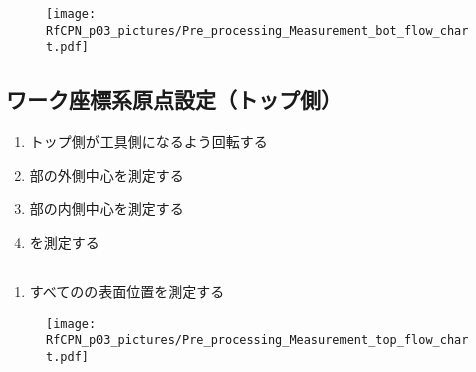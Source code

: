 \begin{figure}[ht]%
\begin{Figbox}[valign=top]%
\texttt{[image: RfCPN\_p03\_pictures/Pre\_processing\_Measurement\_bot\_flow\_chart.pdf]}%
\setlength{\abovecaptionskip}{10pt}%
%
\end{Figbox}%
\end{figure}%


\subsection{ワーク座標系原点設定（トップ側）}
\begin{enumerate}[label*=\sarrow]
\item トップ側が工具側になるよう回転する
\item \TopEndFace 部の外側中心を測定する
\item \TopEndFace 部の内側中心を測定する
\item \KeywayCenter を測定する
\end{enumerate}


\subsection{\DimpleMeasurement}
\begin{enumerate}[label*=\sarrow]
\item すべての\Dimple の表面位置を測定する
\end{enumerate}


\begin{figure}[ht]%
\begin{Figbox}[valign=top]%
\texttt{[image: RfCPN\_p03\_pictures/Pre\_processing\_Measurement\_top\_flow\_chart.pdf]}%
\setlength{\abovecaptionskip}{10pt}%
%
\end{Figbox}%
\end{figure}%




